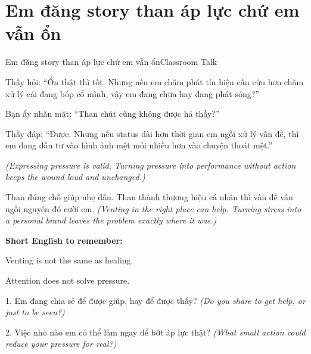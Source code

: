 \section{Em đăng story than áp lực chứ em vẫn ổn}
\begin{truyen}{Em đăng story than áp lực chứ em vẫn ổn}{Classroom Talk}

Thầy hỏi: ``Ổn thật thì tốt. Nhưng nếu em chăm phát tín hiệu cầu cứu hơn chăm xử lý cái đang bóp cổ mình, vậy em đang chữa hay đang phát sóng?''

Bạn ấy nhăn mặt: ``Than chút cũng không được hả thầy?''

Thầy đáp: ``Được. Nhưng nếu status dài hơn thời gian em ngồi xử lý vấn đề, thì em đang đầu tư vào hình ảnh mệt mỏi nhiều hơn vào chuyện thoát mệt.''

\textit{(Expressing pressure is valid. Turning pressure into performance without action keeps the wound loud and unchanged.)}
\end{truyen}

\begin{baihoc}
Than đúng chỗ giúp nhẹ đầu. Than thành thương hiệu cá nhân thì vấn đề vẫn ngồi nguyên đó cười em.
\textit{(Venting in the right place can help. Turning stress into a personal brand leaves the problem exactly where it was.)}
\end{baihoc}

\begin{ghinhoanh}
\textbf{Short English to remember:}

Venting is not the same as healing.

Attention does not solve pressure.
\end{ghinhoanh}

\begin{tuhocnhanh}
1. Em đang chia sẻ để được giúp, hay để được thấy? \textit{(Do you share to get help, or just to be seen?)}

2. Việc nhỏ nào em có thể làm ngay để bớt áp lực thật? \textit{(What small action could reduce your pressure for real?)}
\end{tuhocnhanh}
\ngancach

